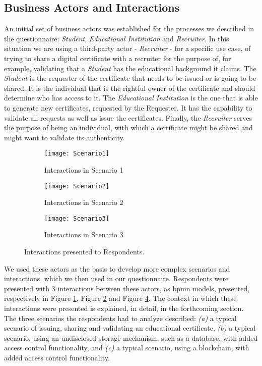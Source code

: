 \subsection{Business Actors and Interactions}

An initial set of business actors was established for the processes we described in the questionnaire: \textit{Student}, \textit{Educational Institution} and \textit{Recruiter}. In this situation we are using a third-party actor - \textit{Recruiter} - for a specific use case, of trying to share a digital certificate with a recruiter for the purpose of, for example, validating that a \textit{Student} has the educational background it claims. The \textit{Student} is the requester of the certificate that needs to be issued or is going to be shared. It is the individual that is the rightful owner of the certificate and should determine who has access to it. The \textit{Educational Institution} is the one that is able to generate new certificates, requested by the Requester. It has the capability to validate all requests as well as issue the certificates. Finally, the \textit{Recruiter} serves the purpose of being an individual, with which a certificate might be shared and might want to validate its authenticity.

\begin{figure}[htb]
	\centering
	\begin{subfigure}[b]{0.3\textwidth}
		\centering
		\texttt{[image: Scenario1]}
		\caption{Interactions in Scenario 1}
		\label{fig: Scenario1}
	\end{subfigure}
	\begin{subfigure}[b]{0.3\textwidth}
		\centering
		\texttt{[image: Scenario2]}
		\caption{Interactions in Scenario 2}
		\label{fig: Scenario2}
	\end{subfigure}
	\begin{subfigure}[b]{0.3\textwidth}
		\centering
		\texttt{[image: Scenario3]}
		\caption{Interactions in Scenario 3}
		\label{fig: Scenario3}
	\end{subfigure}

	\caption{Interactions presented to Respondents.}
\end{figure}

We used these actors as the basis to develop more complex scenarios and interactions, which we then used in our questionnaire. Respondents were presented with 3 interactions between these actors, as \gls{bpmn} \cite{BPMN} models, presented, respectively in Figure \ref{fig: Scenario1}, Figure \ref{fig: Scenario2} and Figure \ref{fig: Scenario3}. The context in which these interactions were presented is explained, in detail, in the forthcoming section. The three scenarios the respondents had to analyze described:
\emph{(a)} a typical scenario of issuing, sharing and validating an educational certificate, \emph{(b)} a typical scenario, using an undisclosed storage mechanism, such as a database, with added access control functionality, and \emph{(c)} a typical scenario, using a blockchain, with added access control functionality.



